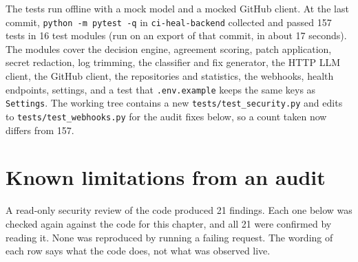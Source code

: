 The tests run offline with a mock model and a mocked GitHub client. At the last commit, \texttt{python -\allowbreak{}m pytest -\allowbreak{}q} in \texttt{ci-\allowbreak{}heal-\allowbreak{}backend} collected and passed 157 tests in 16 test modules (run on an export of that commit, in about 17 seconds). The modules cover the decision engine, agreement scoring, patch application, secret redaction, log trimming, the classifier and fix generator, the HTTP LLM client, the GitHub client, the repositories and statistics, the webhooks, health endpoints, settings, and a test that \texttt{.\allowbreak{}env.\allowbreak{}example} keeps the same keys as \texttt{Settings}. The working tree contains a new \texttt{tests/\allowbreak{}test\_\allowbreak{}security.\allowbreak{}py} and edits to \texttt{tests/\allowbreak{}test\_\allowbreak{}webhooks.\allowbreak{}py} for the audit fixes below, so a count taken now differs from 157.

\section{Known limitations from an audit}

A read-only security review of the code produced 21 findings. Each one below was checked again against the code for this chapter, and all 21 were confirmed by reading it. None was reproduced by running a failing request. The wording of each row says what the code does, not what was observed live.

